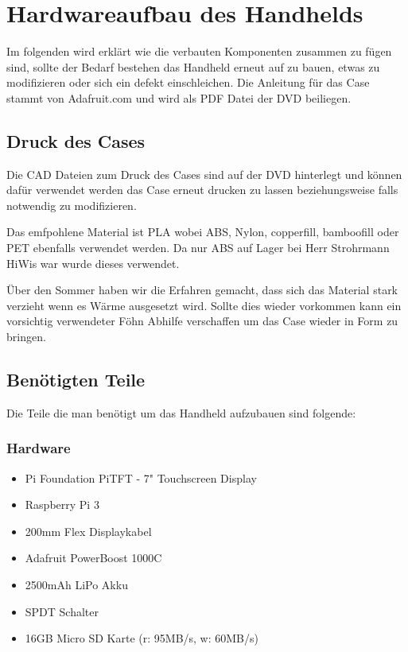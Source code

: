 %
%

\chapter{Hardwareaufbau des Handhelds}

Im folgenden wird erklärt wie die verbauten Komponenten zusammen zu fügen sind, sollte der Bedarf bestehen das Handheld erneut auf zu bauen, etwas zu modifizieren oder sich ein defekt einschleichen. Die Anleitung für das Case stammt von Adafruit.com und wird als PDF Datei der DVD beiliegen. 

\section{Druck des Cases}

Die CAD Dateien zum Druck des Cases sind auf der DVD hinterlegt und können dafür verwendet werden das Case erneut drucken zu lassen beziehungsweise falls notwendig zu modifizieren. 

Das emfpohlene Material ist PLA wobei ABS, Nylon, copperfill, bamboofill oder PET ebenfalls verwendet werden. Da nur ABS auf Lager bei Herr Strohrmann HiWis war wurde dieses verwendet. 

Über den Sommer haben wir die Erfahren gemacht, dass sich das Material stark verzieht wenn es Wärme ausgesetzt wird. Sollte dies wieder vorkommen kann ein vorsichtig verwendeter Föhn Abhilfe verschaffen um das Case wieder in Form zu bringen. 

\section{Benötigten Teile}
Die Teile die man benötigt um das Handheld aufzubauen sind folgende:

\newpage
\subsection{Hardware}
\begin{itemize}
\item Pi Foundation PiTFT - 7" Touchscreen Display 
\item Raspberry Pi 3 
\item 200mm Flex Displaykabel
\item Adafruit PowerBoost 1000C
\item 2500mAh LiPo Akku
\item SPDT Schalter
\item 16GB  Micro SD Karte (r: 95MB/s, w: 60MB/s)
\end{itemize} 

